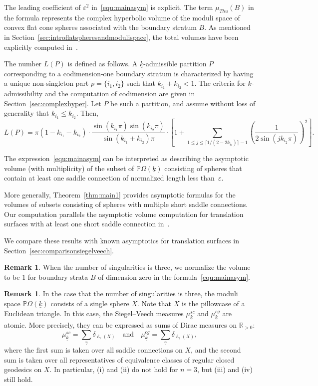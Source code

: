 \documentclass{compositio}
\numberwithin{equation}{section}
\numberwithin{figure}{section}
\theoremstyle{definition}
\newtheorem{remark}[definition]{Remark}
\theoremstyle{plain}
\begin{document}
{The leading coefficient of $\varepsilon^2$ in~\eqref{equ:mainasym} is explicit. The term $\mu_{Thu}(B)$ in the formula represents the complex hyperbolic volume of the moduli space of convex flat cone spheres associated with the boundary stratum $B$. As mentioned in Section~\ref{sec:introflatspheresandmodulispace}, the total volumes have been explicitly computed in~\cite{McMullen,KN,sauvaget2024volumesmodulispacesflat,Ngu24}.

The number $L(P)$ is defined as follows. A $\underline{k}$-admissible partition $P$ corresponding to a codimension-one boundary stratum is characterized by having a unique non-singleton part $p = \{i_1, i_2\}$ such that $k_{i_1} + k_{i_2} < 1$. The criteria for $\underline{k}$-admissibility and the computation of codimension are given in Section~\ref{sec:complexhyper}. Let $P$ be such a partition, and assume without loss of generality that $k_{i_1} \le k_{i_2}$. Then,
$$
L(P)= \pi(1-k_{i_1}-k_{i_2})\cdot\frac{\sin{(k_{i_1}\pi)}\sin{(k_{i_2}\pi)}}{\sin{(k_{i_1}+k_{i_2})\pi}}\cdot\left[ 1 + \sum_{1\le j \le \lceil 1/(2 - 2k_{i_2}) \rceil - 1}    \left( \frac{1}{2\sin(jk_{i_2}\pi)} \right)^2\right].
$$

The expression~\eqref{equ:mainasym} can be interpreted as describing the asymptotic volume (with multiplicity) of the subset of $\mathbb{P}\Omega(\underline{k})$ consisting of spheres that contain at least one saddle connection of normalized length less than~$\varepsilon$.

More generally, Theorem~\ref{thm:main1} provides asymptotic formulas for the volumes of subsets consisting of spheres with multiple short saddle connections. Our computation parallels the asymptotic volume computation for translation surfaces with at least one short saddle connection in~\cite{EMZ}.

We compare these results with known asymptotics for translation surfaces in Section~\ref{sec:comparisonsiegelveech}.

\begin{remark}
    When the number of singularities is three, we normalize the volume to be $1$ for boundary strata $B$ of dimension zero in the formula~\eqref{equ:mainasym}.
\end{remark}

\begin{remark}
    In the case that the number of singularities is three, the moduli space $\mathbb{P}\Omega(\underline k)$ consists of a single sphere $X$. Note that $X$ is the pillowcase of a Euclidean triangle. In this case, the Siegel--Veech measures $\mu^{sc}_{\underline{k}}$ and $\mu^{cg}_{\underline{k}}$ are atomic. More precisely, they can be expressed as sums of Dirac measures on $\mathbb{R}_{>0}$:
    $$
    \mu^{sc}_{\underline{k}} = \sum_{\gamma} \delta_{\ell_{\gamma}(X)} 
    \quad \text{and} \quad 
    \mu^{cg}_{\underline{k}} = \sum_{\gamma} \delta_{\ell_{\gamma}(X)},
    $$
    where the first sum is taken over all saddle connections on $X$, and the second sum is taken over all representatives of equivalence classes of regular closed geodesics on $X$. In particular, (i) and (ii) do not hold for $n=3$, but (iii) and (iv) still hold.
\end{remark}

}
\end{document}
